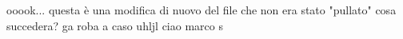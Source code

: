 \usepackage{pdfcomment}


    ooook... questa è una modifica di nuovo del file che non era stato "pullato" cosa succedera?
ga    roba a caso 
uhljl
ciao marco s
    
